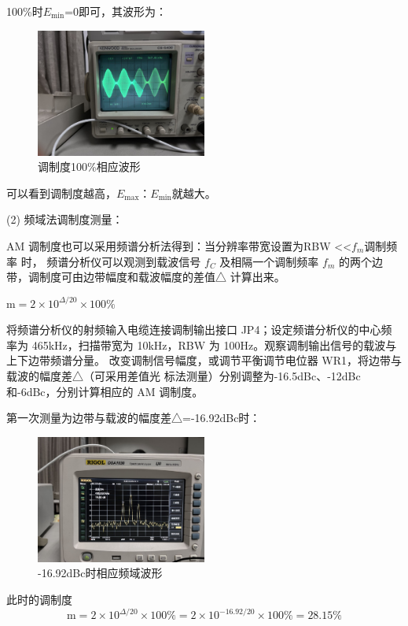 \documentclass{../source/Experiment}
\begin{document}
100\%时$E_{\min }$=0即可，其波形为：
\begin{figure}[H]
    \centering
    \includegraphics[width = 0.5\textwidth]{lab6/8.png}
    \caption{调制度100\%相应波形}
\end{figure}

可以看到调制度越高，$E_{\max }：E_{\min }$就越大。

(2) 频域法调制度测量：

AM 调制度也可以采用频谱分析法得到：当分辨率带宽设置为RBW <<$f_m$调制频率
时，
频谱分析仪可以观测到载波信号
$f_C$ 及相隔一个调制频率
$f_m$
的两个边带，调制度可由边带幅度和载波幅度的差值△
计算出来。

$\mathrm{m}=2 \times 10^{\Delta / 20} \times 100 \%$

将频谱分析仪的射频输入电缆连接调制输出接口 JP4；设定频谱分析仪的中心频率为
465kHz，扫描带宽为 10kHz，RBW 为 100Hz。观察调制输出信号的载波与上下边带频谱分量。
改变调制信号幅度，或调节平衡调节电位器 WR1，将边带与载波的幅度差△（可采用差值光
标法测量）分别调整为-16.5dBc、-12dBc 和-6dBc，分别计算相应的 AM 调制度。

第一次测量为边带与载波的幅度差△=-16.92dBc时：
\begin{figure}[H]
    \centering
    \includegraphics[width = 0.5\textwidth]{lab6/1.jpg}
    \caption{-16.92dBc时相应频域波形}
\end{figure}

此时的调制度$$\mathrm{m}=2 \times 10^{\Delta / 20} \times 100 \%=2 \times 10^{-16.92 / 20} \times 100 \%
    =28.15\%$$
\end{document}

